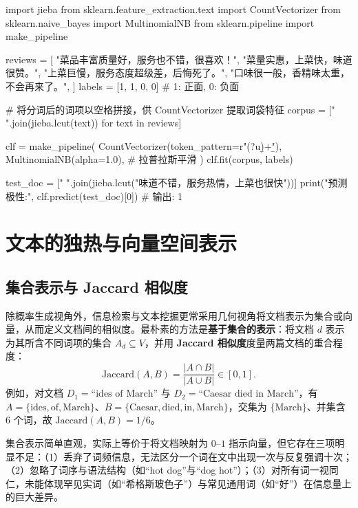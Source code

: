 \begin{codeblock}[language=Python, caption={基于 jieba 与 scikit-learn 的中文情感分类流程}, label={lst:sklearn-mnb}]
import jieba
from sklearn.feature_extraction.text import CountVectorizer
from sklearn.naive_bayes import MultinomialNB
from sklearn.pipeline import make_pipeline

reviews = [
    "菜品丰富质量好，服务也不错，很喜欢！",
    "菜量实惠，上菜快，味道很赞。",
    "上菜巨慢，服务态度超级差，后悔死了。",
    "口味很一般，香精味太重，不会再来了。",
]
labels = [1, 1, 0, 0]  # 1: 正面, 0: 负面

# 将分词后的词项以空格拼接，供 CountVectorizer 提取词袋特征
corpus = [" ".join(jieba.lcut(text)) for text in reviews]

clf = make_pipeline(
    CountVectorizer(token_pattern=r"(?u)\b\w+\b"),
    MultinomialNB(alpha=1.0),  # 拉普拉斯平滑
)
clf.fit(corpus, labels)

test_doc = [" ".join(jieba.lcut("味道不错，服务热情，上菜也很快"))]
print("预测极性:", clf.predict(test_doc)[0])  # 输出: 1
\end{codeblock}

\section{文本的独热与向量空间表示}\label{sec:vsm-tfidf}

\subsection{集合表示与 Jaccard 相似度}

除概率生成视角外，信息检索与文本挖掘更常采用几何视角将文档表示为集合或向量，从而定义文档间的相似度。最朴素的方法是\textbf{基于集合的表示}：将文档 $d$ 表示为其所含不同词项的集合 $A_d \subseteq V$，并用 \textbf{Jaccard 相似度}度量两篇文档的重合程度：
\begin{equation}\label{eq:jaccard}
\mathrm{Jaccard}(A, B) = \frac{|A \cap B|}{|A \cup B|} \in [0, 1].
\end{equation}
例如，对文档 $D_1=\text{``ides of March''}$ 与 $D_2=\text{``Caesar died in March''}$，有 $A=\{\text{ides},\text{of},\text{March}\}$、$B=\{\text{Caesar},\text{died},\text{in},\text{March}\}$，交集为 $\{\text{March}\}$、并集含 $6$ 个词，故 $\mathrm{Jaccard}(A,B)=1/6$。

集合表示简单直观，实际上等价于将文档映射为 $0\text{--}1$ 指示向量，但它存在三项明显不足：（1）丢弃了词频信息，无法区分一个词在文中出现一次与反复强调十次；（2）忽略了词序与语法结构（如“hot dog”与“dog hot”）；（3）对所有词一视同仁，未能体现罕见实词（如“希格斯玻色子”）与常见通用词（如“好”）在信息量上的巨大差异。

